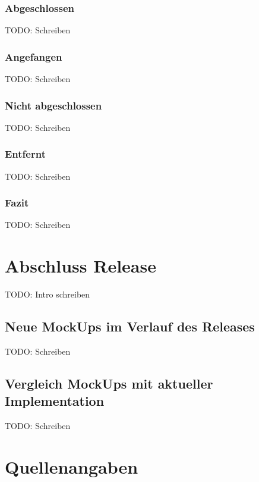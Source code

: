 \documentclass[12pt, titlepage]{scrartcl}
\newcommand{\RN}[1]{%
	\textup{\uppercase\expandafter{\romannumeral#1}}%
}
\begin{document}
	    	\subsubsection{Abgeschlossen}
	    		TODO: Schreiben
	    		\subsubsection{Angefangen}
	    		TODO: Schreiben
	    	\subsubsection{Nicht abgeschlossen}
	    		TODO: Schreiben
	    	\subsubsection{Entfernt}
	    		TODO: Schreiben
	    	\subsubsection{Fazit}
	    		TODO: Schreiben
	\newpage
	\section{Abschluss Release \RN{3}}
		TODO: Intro schreiben
		\subsection{Neue MockUps im Verlauf des Releases \RN{3}}
		TODO: Schreiben
		\subsection{Vergleich MockUps mit aktueller Implementation}
		TODO: Schreiben
	\newpage
	\section{Quellenangaben}
		\listoffigures
		\listoftables
\end{document}
